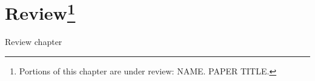 \chapter[Review]{Review\footnote{Portions of this chapter are under review: NAME. PAPER TITLE.} }
\label{chapter:review}

Review chapter
